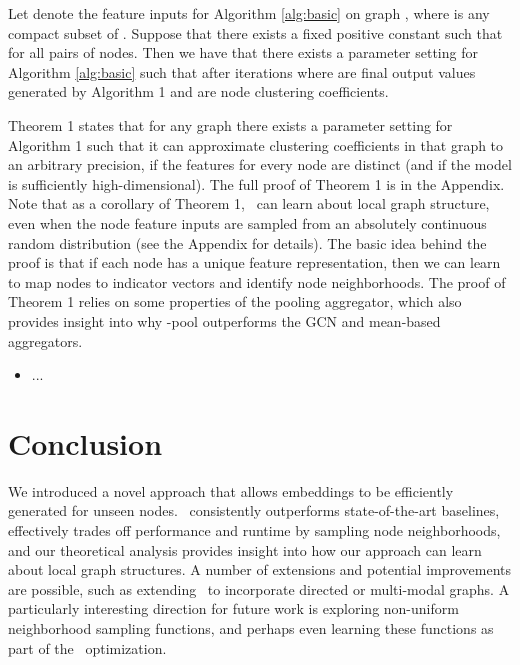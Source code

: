 \begin{theorem}\label{thm:main}
Let  denote the feature inputs for Algorithm \ref{alg:basic} on graph , where  is any compact subset of . Suppose that there exists a fixed positive constant  such that  for all pairs of nodes. Then we have that  there exists a parameter setting  for Algorithm \ref{alg:basic} such that after  iterations
 where  are final output values generated by Algorithm 1 and  are node clustering coefficients.
\end{theorem}

Theorem 1 states that for any graph there exists a parameter setting for Algorithm 1 such that it can approximate clustering coefficients in that graph to an arbitrary precision, if the features for every node are distinct (and if the model is sufficiently high-dimensional). 
The full proof of Theorem 1 is in the Appendix. 
Note that as a corollary of Theorem 1, \name\ can learn about local graph structure, even when the node feature inputs are sampled from an absolutely continuous random distribution (see the Appendix for details).
The basic idea behind the proof is that if each node has a unique feature representation, then we can learn to map nodes to indicator vectors and identify node neighborhoods.
The proof of Theorem 1 relies on some properties of the pooling aggregator, which also provides insight into why \name-pool outperforms the GCN and mean-based aggregators. 

\begin{itemize}
	\item ...
\end{itemize}


\section{Conclusion}

We introduced a novel approach that allows embeddings to be efficiently generated for unseen nodes. 
\name\ consistently outperforms state-of-the-art baselines, effectively trades off performance and runtime by sampling node neighborhoods, and our theoretical analysis provides insight into how our approach can learn about local graph structures. 
A number of extensions and potential improvements are possible, such as extending \name\ to incorporate directed or multi-modal graphs. 
A particularly interesting direction for future work is exploring non-uniform neighborhood sampling functions, and perhaps even learning these functions as part of the \name\ optimization. 

